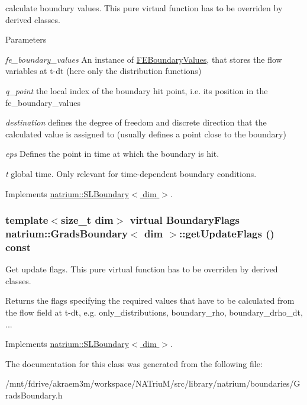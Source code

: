 calculate boundary values. This pure virtual function has to be overriden by derived classes. 
\begin{DoxyParams}{Parameters}
\item[{\em fe\_\-boundary\_\-values}]An instance of \hyperlink{classnatrium_1_1FEBoundaryValues}{FEBoundaryValues}, that stores the flow variables at t-\/dt (here only the distribution functions) \item[{\em q\_\-point}]the local index of the boundary hit point, i.e. its position in the fe\_\-boundary\_\-values \item[{\em destination}]defines the degree of freedom and discrete direction that the calculated value is assigned to (usually defines a point close to the boundary) \item[{\em eps}]Defines the point in time at which the boundary is hit. \item[{\em t}]global time. Only relevant for time-\/dependent boundary conditions. \end{DoxyParams}


Implements \hyperlink{classnatrium_1_1SLBoundary_a7c166745b087afdd137013f994733b89}{natrium::SLBoundary$<$ dim $>$}.\hypertarget{classnatrium_1_1GradsBoundary_a1f8deb8033e218d7890b0db5d72f5508}{
\subsubsection[{getUpdateFlags}]{\setlength{\rightskip}{0pt plus 5cm}template$<$size\_\-t dim$>$ virtual {\bf BoundaryFlags} {\bf natrium::GradsBoundary}$<$ dim $>$::getUpdateFlags () const}}
\label{classnatrium_1_1GradsBoundary_a1f8deb8033e218d7890b0db5d72f5508}


Get update flags. This pure virtual function has to be overriden by derived classes. \begin{DoxyReturn}{Returns}
the flags specifying the required values that have to be calculated from the flow field at t-\/dt, e.g. only\_\-distributions, boundary\_\-rho, boundary\_\-drho\_\-dt, ... 
\end{DoxyReturn}


Implements \hyperlink{classnatrium_1_1SLBoundary_ad2b9a7f797b3af9b6493f9e9c5da5434}{natrium::SLBoundary$<$ dim $>$}.

The documentation for this class was generated from the following file:\begin{DoxyCompactItemize}
\item 
/mnt/fdrive/akraem3m/workspace/NATriuM/src/library/natrium/boundaries/GradsBoundary.h\end{DoxyCompactItemize}
